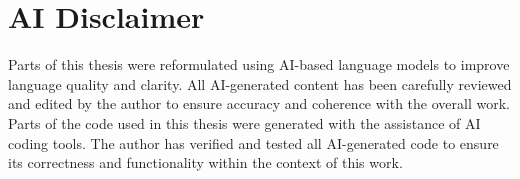 \newpage
\section*{AI Disclaimer}
\thispagestyle{empty}
Parts of this thesis were reformulated using AI-based language models to improve language quality and clarity. All AI-generated content has been carefully reviewed and edited by the author to ensure accuracy and coherence with the overall work.
\vspace{\baselineskip}\\
Parts of the code used in this thesis were generated with the assistance of AI coding tools. The author has verified and tested all AI-generated code to ensure its correctness and functionality within the context of this work.
